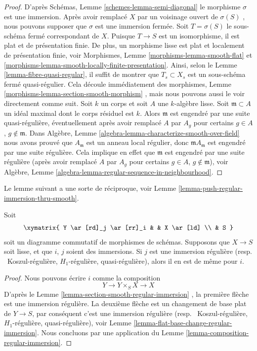 \begin{proof}
D'après Schémas, Lemme  \ref{schemes-lemma-semi-diagonal}  le morphisme  $\sigma$  est une immersion.
Après avoir remplacé  $X$  par un voisinage ouvert de  $\sigma(S)$ , nous
pouvons supposer que  $\sigma$  est une immersion fermée. Soit  $T = \sigma(S)$  le
sous-schéma fermé correspondant de  $X$. Puisque  $T \to S$  est un
isomorphisme, il est plat et de présentation finie. De plus, un morphisme lisse
est plat et localement de présentation finie, voir Morphismes, Lemme  \ref{morphisms-lemma-smooth-flat} 
et  \ref{morphisms-lemma-smooth-locally-finite-presentation}. Ainsi, selon le Lemme  \ref{lemma-fibre-quasi-regular}, il suffit de montrer que
 $T_s \subset X_s$  est un sous-schéma fermé quasi-régulier. Cela découle immédiatement
des morphismes, Lemme  \ref{morphisms-lemma-section-smooth-morphism} , mais nous pouvons aussi le voir directement
comme suit. Soit  $k$  un corps et soit  $A$  une
 $k$-algèbre lisse. Soit  $\mathfrak m \subset A$  un idéal maximal dont le corps
résiduel est  $k$. Alors  $\mathfrak m$  est engendré par une suite
quasi-régulière, éventuellement après avoir remplacé  $A$  par  $A_g$ 
pour certains  $g \in A$,  $g \not \in \mathfrak m$. Dans Algèbre, Lemme  \ref{algebra-lemma-characterize-smooth-over-field}  nous
avons prouvé que  $A_{\mathfrak m}$  est un anneau local régulier, donc  $\mathfrak mA_{\mathfrak m}$  est
engendré par une suite régulière. Cela implique en effet que  $\mathfrak m$  est
engendré par une suite régulière (après avoir remplacé  $A$  par
 $A_g$  pour certains  $g \in A$,  $g \not \in \mathfrak m$), voir Algèbre, Lemme
 \ref{algebra-lemma-regular-sequence-in-neighbourhood}.
\end{proof}

\noindent
Le lemme suivant a une sorte de réciproque, voir Lemme  \ref{lemma-push-regular-immersion-thru-smooth}.

\begin{lemma}
\label{lemma-lift-regular-immersion-to-smooth}
Soit
$$
\xymatrix{
Y \ar[rd]_j \ar[rr]_i & & X \ar[ld] \\
& S
}
$$
soit un diagramme commutatif de morphismes de schémas. Supposons que  $X \to S$ 
soit lisse, et que  $i$,  $j$  soient des immersions. Si
 $j$  est une immersion régulière (resp. \ Koszul-régulière,
 $H_1$-régulière, quasi-régulière), alors il en est de même pour
 $i$.
\end{lemma}

\begin{proof}
Nous pouvons écrire  $i$  comme la composition
$$
Y \to Y \times_S X \to X
$$
D'après le Lemme  \ref{lemma-section-smooth-regular-immersion} , la première flèche est une immersion régulière.
La deuxième flèche est un changement de base plat de  $Y \to S$, par conséquent
c'est une immersion régulière (resp. \ Koszul-régulière,
 $H_1$-régulière, quasi-régulière), voir Lemme  \ref{lemma-flat-base-change-regular-immersion}. Nous concluons
par une application du Lemme  \ref{lemma-composition-regular-immersion}.
\end{proof}

